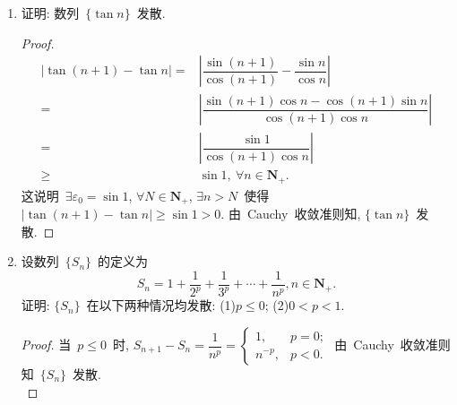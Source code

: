 \documentclass[UTF8,a4paper,11pt,twoside]{book}
\begin{document}
\begin{enumerate}
\begin{proof}
		      假设已经找出了~$x_{n_k}$, 使得~$x_{n_k}>x_{n_{k-1}}$, $x_{n_{k}}>M_k=k$, 则对于~$M_{k+1}=k+1$, $\exists n_{k+1}\in\mathbf{N}_{+}, n_{k+1}>n_{k}$, 使得~$x_{n_{k+1}}>k+1$, 断言这样的~$n_{k+1}$~是可以找到的, 否则~$\forall n>n_k$, $x_n\leqslant M_{k+1}$, 与~$\{x_n\}$~无界矛盾. 由数学归纳法可知找出了数列~$\{x_{n_{k}}\}$~使得~$n_1<n_2<\cdots<n_k<n_{k+1}<\cdots$, $x_{n_k}>k, k\in\mathbf{N}_{+}$. 这说明~$\{x_{n_k}\}$~是~$\{x_n\}$~的子列, 并且~$\{x_{n_k}\}$~是正的无穷大量. 同理若~$\{x_n\}$~无下界时可找到一个子列是负的无穷大量.\qedhere
	      \end{proof}
	\item 证明: 数列~$\{\tan{n}\}$~发散.
	      \begin{proof}
		      \begin{equation*}
			      \begin{split}
				      |\tan(n+1)-\tan{n}|=&\left|\dfrac{\sin(n+1)}{\cos(n+1)}-\dfrac{\sin{n}}{\cos{n}}\right|\\
				      =&\left|\dfrac{\sin(n+1)\cos{n}-\cos(n+1)\sin{n}}{\cos(n+1)\cos{n}}\right|\\
				      =&\left|\dfrac{\sin{1}}{\cos(n+1)\cos{n}}\right|\\
				      \geqslant&\sin{1},\ \forall n\in\mathbf{N}_{+}.
			      \end{split}
		      \end{equation*}
		      这说明~$\exists\varepsilon_0=\sin{1}$, $\forall N\in\mathbf{N}_{+}$, $\exists n>N$~使得~$|\tan(n+1)-\tan{n}|\geqslant\sin{1}>0$. 由~Cauchy~收敛准则知, $\{\tan{n}\}$~发散.\qedhere
	      \end{proof}
	\item 设数列~$\{S_n\}$~的定义为
	      \[
		      S_n=1+\dfrac{1}{2^p}+\dfrac{1}{3^p}+\cdots+\dfrac{1}{n^p}, n\in\mathbf{N}_{+}.
	      \]
	      证明: $\{S_n\}$~在以下两种情况均发散: (1)$p\leqslant 0$; (2)$0<p<1$.
	      \begin{proof}
		      当~$p\leqslant 0$~时, $S_{n+1}-S_n=\dfrac{1}{n^p}=\begin{cases}1, & p=0;\\ n^{-p}, & p<0.\end{cases}$ 由~Cauchy~收敛准则知~$\{S_n\}$~发散.\\


\end{proof}
\end{enumerate}
\end{document}
